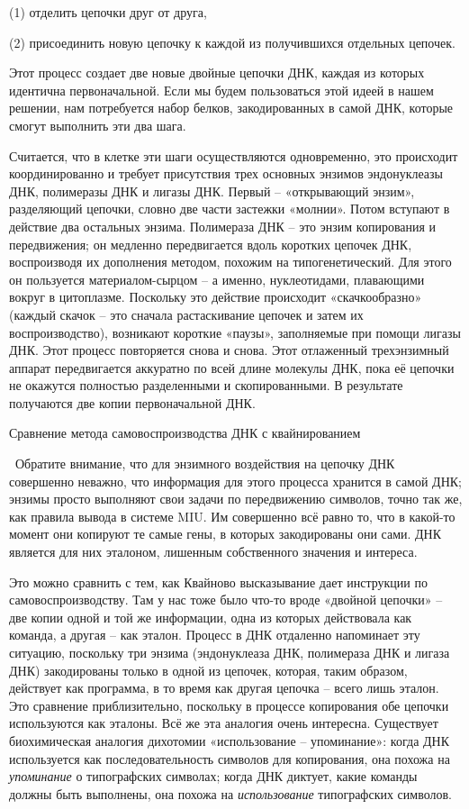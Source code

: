 \documentclass[../main.tex]{subfiles}
\begin{document}
(1) отделить цепочки друг от друга,

(2) присоединить новую цепочку к каждой из получившихся отдельных цепочек.

Этот процесс создает две новые двойные цепочки ДНК, каждая из которых идентична первоначальной. Если мы будем пользоваться этой идеей в нашем решении, нам потребуется набор белков, закодированных в самой ДНК, которые смогут выполнить эти два шага.

Считается, что в клетке эти шаги осуществляются одновременно, это происходит координированно и требует присутствия трех основных энзимов эндонуклеазы ДНК, полимеразы ДНК и лигазы ДНК\@. Первый \--- «открывающий энзим», разделяющий цепочки, словно две части застежки «молнии». Потом вступают в действие два остальных энзима. Полимераза ДНК \--- это энзим копирования и передвижения; он медленно передвигается вдоль коротких цепочек ДНК, воспроизводя их дополнения методом, похожим на типогенетический. Для этого он пользуется материалом-сырцом \--- а именно, нуклеотидами, плавающими вокруг в цитоплазме. Поскольку это действие происходит «скачкообразно» (каждый скачок \--- это сначала растаскивание цепочек и затем их воспроизводство), возникают короткие «паузы», заполняемые при помощи лигазы ДНК\@. Этот процесс повторяется снова и снова. Этот отлаженный трехэнзимный аппарат передвигается аккуратно по всей длине молекулы ДНК, пока её цепочки не окажутся полностью разделенными и скопированными. В результате получаются две копии первоначальной ДНК.

Сравнение метода самовоспроизводства ДНК с квайнированием

~Обратите внимание, что для энзимного воздействия на цепочку ДНК совершенно неважно, что информация для этого процесса хранится в самой ДНК; энзимы просто выполняют свои задачи по передвижению символов, точно так же, как правила вывода в системе MIU\@. Им совершенно всё равно то, что в какой-то момент они копируют те самые гены, в которых закодированы они сами. ДНК является для них эталоном, лишенным собственного значения и интереса.

Это можно сравнить с тем, как Квайново высказывание дает инструкции по самовоспроизводству. Там у нас тоже было что-то вроде «двойной цепочки» \--- две копии одной и той же информации, одна из которых действовала как команда, а другая \--- как эталон. Процесс в ДНК отдаленно напоминает эту ситуацию, поскольку три энзима (эндонуклеаза ДНК, полимераза ДНК и лигаза ДНК) закодированы только в одной из цепочек, которая, таким образом, действует как программа, в то время как другая цепочка \--- всего лишь эталон. Это сравнение приблизительно, поскольку в процессе копирования обе цепочки используются как эталоны. Всё же эта аналогия очень интересна. Существует биохимическая аналогия дихотомии «использование \--- упоминание»: когда ДНК используется как последовательность символов для копирования, она похожа на \emph{упоминание} о типографских символах; когда ДНК диктует, какие команды должны быть выполнены, она похожа на \emph{использование} типографских символов.
\end{document}
